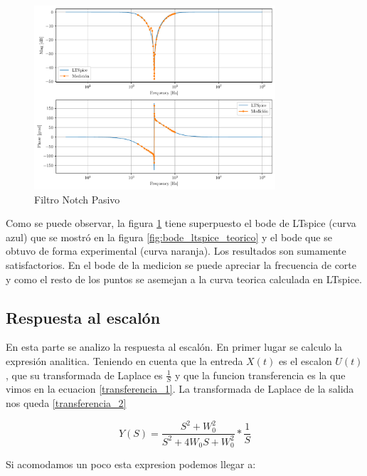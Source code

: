 \documentclass[12pt,a4paper]{article}
\begin{document}
\begin{figure}[ht]                                                       
    \centering\includegraphics[width=0.8\textwidth]{Superpuesto.pdf}
    \caption{Filtro Notch Pasivo}
    \label{fig:superpuesto}
   \end{figure}

Como se puede observar, la figura \ref{fig:superpuesto} tiene superpuesto el bode
de LTspice (curva azul) que se mostró en la figura \ref{fig:bode_ltspice_teorico} y el bode que se obtuvo de
forma experimental (curva naranja). Los resultados son 
sumamente satisfactorios. En el bode de la medicion se puede apreciar la frecuencia de corte y como
el resto de los puntos se asemejan a la curva teorica calculada en LTspice. 



\subsection{Respuesta al escalón}
En esta parte se analizo la respuesta al escalón. En primer lugar se calculo la expresión analitica. Teniendo en cuenta que 
la entreda $X(t)$ es el escalon $U(t)$, que su transformada de Laplace es $\frac{1}{S}$ y que la funcion transferencia es la que 
vimos en la ecuacion \ref{transferencia_1}. La transformada de Laplace de la salida nos queda \ref{transferencia_2}


\begin{equation} Y(S) = \frac{S^2+W_{0}^2}{S^2+4W_{0}S+W_{0}^2} * \frac{1}{S}  \label{transferencia_2}\end{equation}

Si acomodamos un poco esta expresion podemos llegar a: \\
\end{document}
